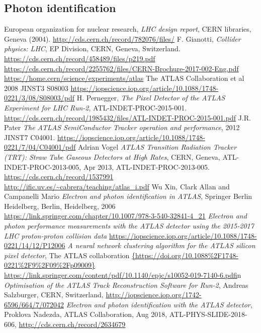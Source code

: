 \documentclass[a4paper, oneside]{book}
\begin{document}
			\subsection{Photon identification}
	\begin{thebibliography}{10}
			 European organization for nuclear research, \textit{LHC design report}, CERN libraries, Geneva (2004). \url{http://cds.cern.ch/record/782076/files/}
			 F. Gianotti, \textit{Collider physics: LHC}, EP Division, CERN, Geneva, Switzerland. \url{https://cds.cern.ch/record/458489/files/p219.pdf}
			 \url{https://cds.cern.ch/record/2255762/files/CERN-Brochure-2017-002-Eng.pdf}
			 \url{https://home.cern/science/experiments/atlas}
			  The ATLAS Collaboration et al 2008 JINST3 S08003
			\url{https://iopscience.iop.org/article/10.1088/1748-0221/3/08/S08003/pdf}
			 H. Pernegger, \textit{The Pixel Detector of the ATLAS Experiment for LHC Run-2}, ATL-INDET-PROC-2015-001. \url{https://cds.cern.ch/record/1985432/files/ATL-INDET-PROC-2015-001.pdf}
			 J.R. Pater \textit{The ATLAS SemiConductor Tracker operation and performance}, 2012 JINST7 C04001. \url{https://iopscience.iop.org/article/10.1088/1748-0221/7/04/C04001/pdf}
			 Adrian Vogel \textit{ATLAS Transition Radiation Tracker (TRT): Straw Tube Gaseous Detectors at High Rates}, CERN,
			Geneva, ATL-INDET-PROC-2013-005, Apr 2013, ATL-INDET-PROC-2013-005. \url{https://cds.cern.ch/record/1537991}
			\url{http://ific.uv.es/~cabrera/teaching/atlas_i.pdf}
			 Wu Xin, Clark Allan and Campanelli Mario \textit{Electron and photon identification in ATLAS}, Springer Berlin Heidelberg, Berlin, Heidelberg, 2006
			\url{https://link.springer.com/chapter/10.1007/978-3-540-32841-4_21} 
			\textit{Electron and photon performance measurements with the {ATLAS} detector using the 2015-2017 {LHC} proton-proton collision data}
			\url{https://iopscience.iop.org/article/10.1088/1748-0221/14/12/P12006}
			 \textit{A neural network clustering algorithm for the ATLAS silicon pixel detector}, The ATLAS collaboration
			\url{{https://doi.org/10.1088%2F1748-0221%2F9%2F09%2Fp09009}}
			\url{https://link.springer.com/content/pdf/10.1140/epjc/s10052-019-7140-6.pdf}in
			 \textit{Optimisation of the ATLAS Track Reconstruction Software for Run-2}, Andreas Salzburger, CERN, Switzerland, \url{http://iopscience.iop.org/1742-6596/664/7/072042}
			 \textit{Electron and photon identification with the ATLAS detector}, Proklova Nadezda, ATLAS Collaboration, Aug 2018, ATL-PHYS-SLIDE-2018-606, \url{http://cds.cern.ch/record/2634679}
	\end{thebibliography}
\end{document}

